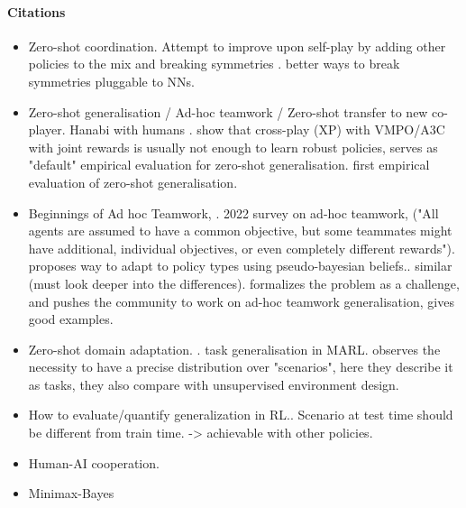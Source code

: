\paragraph{Citations}
\begin{itemize}
    \item Zero-shot coordination. Attempt to improve upon self-play by adding other policies to the mix and breaking symmetries \citep{hu_other_play_zero_2020}. \citep{muglich_equivariant_networks_zero_2022} better ways to break symmetries pluggable to NNs.
    \item Zero-shot generalisation / Ad-hoc teamwork / Zero-shot transfer to new co-player. Hanabi with humans \citep{hu_other_play_zero_2020}. \citep{leibo_scalable_evaluation_multi_2021, agapiou_melting_pot_2_2023} show that cross-play (XP) with VMPO/A3C with joint rewards is usually not enough to learn robust policies, serves as "default" empirical evaluation for zero-shot generalisation. \citep{barrett_empirical_evaluation_ad_2011} first empirical evaluation of zero-shot generalisation. 
    \item Beginnings of Ad hoc Teamwork, \citep{bowling_coordination_adapatation_impromptu_2005, rovatsos_towards_social_complexity_2002}. 2022 survey on ad-hoc teamwork, \citep{mirsky_survey_ad_hoc_2022} ("All agents are assumed to have a common objective, but some teammates might have additional, individual objectives, or even completely different rewards").
    \citep{albrecht_empirical_study_practical_2015} proposes way to adapt to policy types using pseudo-bayesian beliefs..
     \citep{muglich_generalized_beliefs_cooperative_2022} similar (must look deeper into the differences). \citep{stone_ad_hoc_autonomous_2010} formalizes the problem as a challenge, and pushes the community to work on ad-hoc teamwork generalisation, gives good examples.
    \item Zero-shot domain adaptation. \citep{higgins_darla_improving_zero_2017}. \citep{schafer_task_generalisation_multi_2022} task generalisation in MARL. \citep{garcin_how_level_sampling_2023} observes the necessity to have a precise distribution over "scenarios", here they describe it as tasks, they also compare with unsupervised environment design. 
    \item How to evaluate/quantify generalization in RL.\citep{cobbe_quantifying_generalization_reinforcement_2019}. Scenario at test time should be different from train time. -> achievable with other policies.
    \item Human-AI cooperation. 
    \item Minimax-Bayes \citep{berger_statistical_decision_theory_1985}

\end{itemize}
